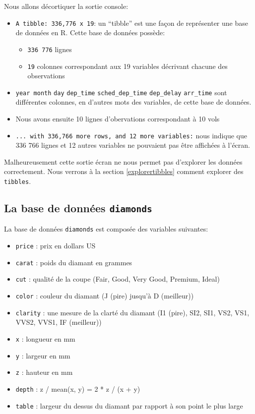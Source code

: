 \documentclass[]{book}
\providecommand{\tightlist}{%
  \setlength{\itemsep}{0pt}\setlength{\parskip}{0pt}}
\theoremstyle{definition}
\theoremstyle{definition}
\theoremstyle{definition}
\theoremstyle{remark}
\begin{document}
Nous allons décortiquer la sortie console:

\begin{itemize}
\tightlist
\item
  \texttt{A\ tibble:\ 336,776\ x\ 19}: un ``tibble'' est une façon de
  représenter une base de données en R. Cette base de données possède:

  \begin{itemize}
  \tightlist
  \item
    \texttt{336\ 776} lignes
  \item
    \texttt{19} colonnes correspondant aux 19 variables décrivant
    chacune des observations
  \end{itemize}
\item
  \texttt{year\ month} \texttt{day} \texttt{dep\_time}
  \texttt{sched\_dep\_time} \texttt{dep\_delay} \texttt{arr\_time} sont
  différentes colonnes, en d'autres mots des variables, de cette base de
  données.
\item
  Nous avons ensuite 10 lignes d'obervations correspondant à 10 vols
\item
  \texttt{...\ with\ 336,766\ more\ rows,\ and\ 12\ more\ variables:}
  nous indique que 336 766 lignes et 12 autres variables ne pouvaient
  pas être affichées à l'écran.
\end{itemize}

Malheureusement cette sortie écran ne nous permet pas d'explorer les
données correctement. Nous verrons à la section \ref{explorertibbles}
comment explorer des \texttt{tibbles}.

\hypertarget{donneesdiamonds}{%
\subsection{\texorpdfstring{La base de données
\texttt{diamonds}}{La base de données diamonds}}\label{donneesdiamonds}}

La base de données \texttt{diamonds} est composée des variables
suivantes:

\begin{itemize}
\tightlist
\item
  \texttt{price} : prix en dollars US
\item
  \texttt{carat} : poids du diamant en grammes
\item
  \texttt{cut} : qualité de la coupe (Fair, Good, Very Good, Premium,
  Ideal)
\item
  \texttt{color} : couleur du diamant (J (pire) jusqu'à D (meilleur))
\item
  \texttt{clarity} : une mesure de la clarté du diamant (I1 (pire), SI2,
  SI1, VS2, VS1, VVS2, VVS1, IF (meilleur))
\item
  \texttt{x} : longueur en mm
\item
  \texttt{y} : largeur en mm
\item
  \texttt{z} : hauteur en mm
\item
  \texttt{depth} : z / mean(x, y) = 2 * z / (x + y)
\item
  \texttt{table} : largeur du dessus du diamant par rapport à son point
  le plus large
\end{itemize}
\end{document}
